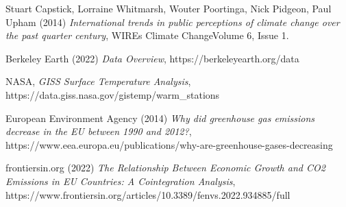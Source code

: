 \begin{thebibliography}{9}

Stuart Capstick, Lorraine Whitmarsh, Wouter Poortinga, Nick Pidgeon, Paul Upham (2014) \emph{International trends in public perceptions of climate change over the past quarter century}, WIREs Climate ChangeVolume 6, Issue 1.

Berkeley Earth (2022) \emph{Data Overview}, https://berkeleyearth.org/data

NASA, \emph{GISS Surface Temperature Analysis}, https://data.giss.nasa.gov/gistemp/warm\_stations

European Environment Agency (2014) \emph{Why did greenhouse gas emissions decrease in the EU between 1990 and 2012?}, https://www.eea.europa.eu/publications/why-are-greenhouse-gases-decreasing

frontiersin.org (2022) \emph{The Relationship Between Economic Growth and CO2 Emissions in EU Countries: A Cointegration Analysis}, https://www.frontiersin.org/articles/10.3389/fenvs.2022.934885/full 

\end{thebibliography}